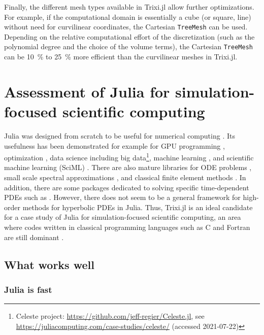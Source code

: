 \documentclass[hidelinks]{juliacon} %
\newcommand{\trixi}{Trixi.jl\xspace}
\begin{document}
Finally, the different mesh types available in \trixi allow further optimizations.
For example, if the computational domain is essentially a cube (or square, line)
without need for curvilinear coordinates, the Cartesian \lstinline{TreeMesh} can
be used. Depending on the relative computational effort of the discretization
(such as the polynomial degree and the choice of the volume terms), the
Cartesian \lstinline{TreeMesh} can be \SI{10}{\percent} to \SI{25}{\percent}
more efficient than the curvilinear meshes in \trixi.

\section{Assessment of Julia for simulation-focused scientific computing}
\label{sec:assessment-of-julia}

Julia was designed from scratch to be useful for numerical computing
\cite{bezanson2017julia}. Its usefulness has been demonstrated for example for
GPU programming \cite{besard2018juliagpu, omlin2020solving},
optimization \cite{dunning2017jump}, data science including
big data\footnote{Celeste project: \url{https://github.com/jeff-regier/Celeste.jl},
see \url{https://juliacomputing.com/case-studies/celeste/} (accessed 2021-07-22)},
machine learning \cite{innes2018fashionable}, and scientific machine learning
(SciML) \cite{pal2021opening}. There are also mature libraries for ODE problems
\cite{rackauckas2017differentialequations}, small scale spectral approximations
\cite{olver2014practical}, and classical finite element methods \cite{badia2020gridap}.
In addition, there are some packages dedicated to solving specific time-dependent
PDEs such as \cite{ramadhan2020oceananigans, constantinou2021geophysicalflows}.
However, there does not seem to be a general framework for high-order methods
for hyperbolic PDEs in Julia. Thus, \trixi is an ideal candidate for a case study
of Julia for simulation-focused scientific computing, an area where codes written
in classical programming languages such as C and Fortran are still dominant
\cite{krais2021flexi, parsani2021ssdc}.

\subsection{What works well}

\subsubsection{Julia is fast}
\end{document}
